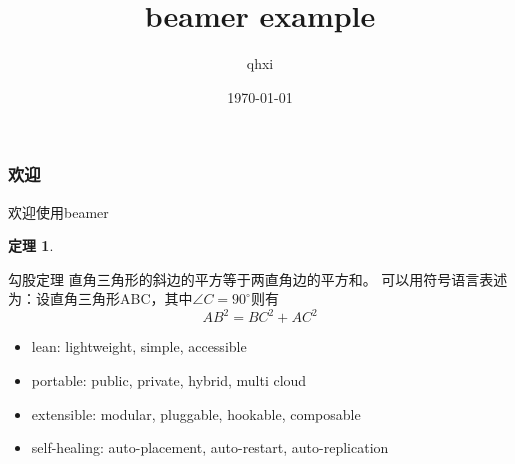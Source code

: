 \documentclass{beamer}
\title{beamer example} %
\author{qhxi} %
\institute[onecloud] %
{
	onecloud \\ %
	\medskip
	\textit{xiqh@onecloud.cn} %
}
\date{\today} %
\begin{document}
\newcommand{\sech}{\mbox{sech}}
\newtheorem{thm}{定理}[section]

\frame{\titlepage}
\frame{\tableofcontents}

\begin{frame} \frametitle{欢迎}
	欢迎使用beamer
	\begin{thm}
	\end{thm}

	\begin{block}{勾股定理}  
		直角三角形的斜边的平方等于两直角边的平方和。  
		可以用符号语言表述为：设直角三角形ABC，其中$\angle C=90^\circ$则有  
		\begin{equation}  
			AB^2=BC^2+AC^2  
		\end{equation}  
	\end{block}  

	\begin{itemize}
		\item lean: lightweight, simple, accessible\\
			\pause
		\item portable: public, private, hybrid, multi cloud\\
			\pause
		\item extensible: modular, pluggable, hookable, composable\\
			\pause
		\item self-healing: auto-placement, auto-restart, auto-replication\\
	\end{itemize}
\end{frame}
\end{document}
